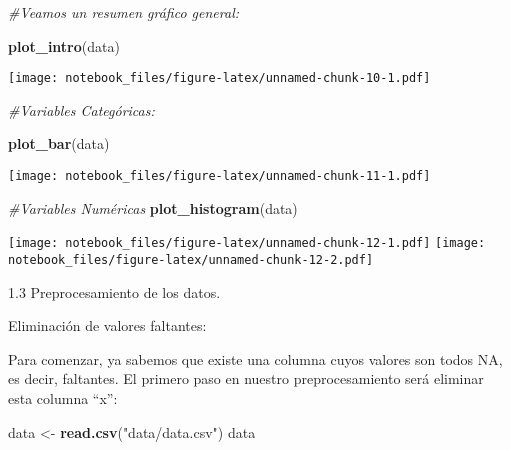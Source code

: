 \documentclass[
]{article}
\newenvironment{Shaded}{\begin{snugshade}}{\end{snugshade}}
\newcommand{\CommentTok}[1]{\textcolor[rgb]{0.56,0.35,0.01}{\textit{#1}}}
\newcommand{\FunctionTok}[1]{\textcolor[rgb]{0.13,0.29,0.53}{\textbf{#1}}}
\newcommand{\NormalTok}[1]{#1}
\newcommand{\OtherTok}[1]{\textcolor[rgb]{0.56,0.35,0.01}{#1}}
\newcommand{\StringTok}[1]{\textcolor[rgb]{0.31,0.60,0.02}{#1}}
\begin{document}
\begin{Shaded}
\begin{Highlighting}[]
\CommentTok{\#Veamos un resumen gráfico general:}

\FunctionTok{plot\_intro}\NormalTok{(data)}
\end{Highlighting}
\end{Shaded}

\texttt{[image: notebook\_files/figure-latex/unnamed-chunk-10-1.pdf]}

\begin{Shaded}
\begin{Highlighting}[]
\CommentTok{\#Variables Categóricas:}

\FunctionTok{plot\_bar}\NormalTok{(data)}
\end{Highlighting}
\end{Shaded}

\texttt{[image: notebook\_files/figure-latex/unnamed-chunk-11-1.pdf]}

\begin{Shaded}
\begin{Highlighting}[]
\CommentTok{\#Variables Numéricas}
\FunctionTok{plot\_histogram}\NormalTok{(data)}
\end{Highlighting}
\end{Shaded}

\texttt{[image: notebook\_files/figure-latex/unnamed-chunk-12-1.pdf]}
\texttt{[image: notebook\_files/figure-latex/unnamed-chunk-12-2.pdf]}

1.3 Preprocesamiento de los datos.

Eliminación de valores faltantes:

Para comenzar, ya sabemos que existe una columna cuyos valores son todos
NA, es decir, faltantes. El primero paso en nuestro preprocesamiento
será eliminar esta columna ``x'':

\begin{Shaded}
\begin{Highlighting}[]
\NormalTok{data }\OtherTok{\textless{}{-}} \FunctionTok{read.csv}\NormalTok{(}\StringTok{"data/data.csv"}\NormalTok{)}
\NormalTok{data}
\end{Highlighting}
\end{Shaded}
\end{document}
